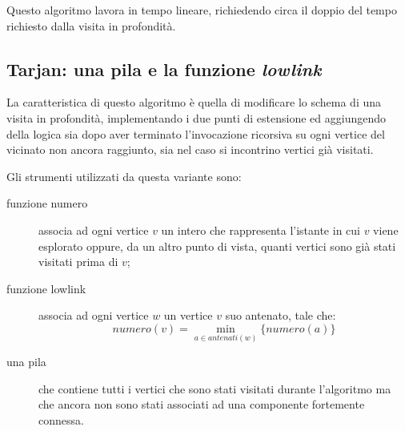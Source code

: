 Questo algoritmo lavora in tempo lineare, richiedendo circa il doppio
del tempo richiesto dalla visita in profondit\`a.

\subsection{Tarjan: una pila e la funzione \emph{lowlink}}
\label{subsection:tarjan-algorithm}
La caratteristica di questo algoritmo \`e quella di modificare lo
schema di una visita in profondit\`a, implementando i due punti di
estensione ed aggiungendo della logica sia dopo aver terminato
l'invocazione ricorsiva su ogni vertice del vicinato non ancora
raggiunto, sia nel caso si incontrino vertici gi\`a visitati.

Gli strumenti utilizzati da questa variante sono:
\begin{description}
\item[funzione numero] associa ad ogni vertice $v$ un intero che
  rappresenta l'istante in cui $v$ viene esplorato oppure, da un altro
  punto di vista, quanti vertici sono gi\`a stati visitati prima di
  $v$;
\item[funzione lowlink] associa ad ogni vertice $w$ un vertice $v$ suo
  antenato, tale che:
  \begin{displaymath}
    numero(v) = \min_{a \in antenati(w)}\{numero(a)\}
\end{displaymath}
\item[una pila] che contiene tutti i vertici che sono stati visitati
  durante l'algoritmo ma che ancora non sono stati associati ad una
  componente fortemente connessa.
\end{description}

